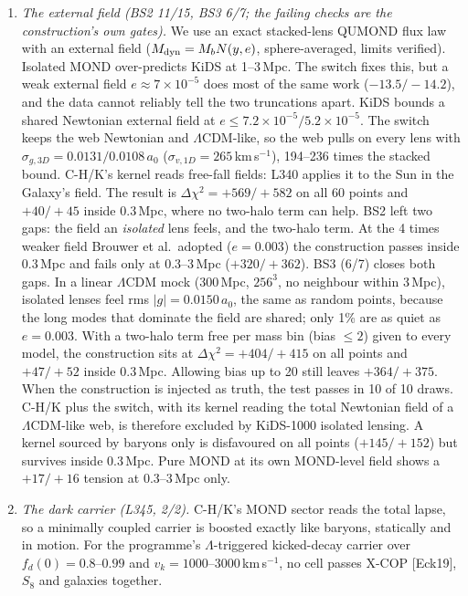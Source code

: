 \documentclass[10pt]{article}
\begin{document}
\begin{enumerate}[label=(\alph*)]
On the observable, the 1D flux power at fixed mean transmission, the worst deviation is 10.8\% at $x_c=5$ (9.6\% canonical) and 7.2\% at $x_c=7$, against a pre-declared 10\%. That is borderline, and the margin is below the method's systematics (FGPA on a 0.2--0.4\,$h^{-1}$Mpc grid, one realisation).
The thresholds KiDS accepts ($x_c\lesssim3$) have not yet been run on the flux observable. The flux deviation grows as $x_c$ falls (7.2\% at 7, 10.8\% at 5), so a KiDS--forest pincer is expected but is \emph{not} claimed here. L352's statement that it is closed rests on matter power.
\item \emph{The external field (BS2 11/15, BS3 6/7; the failing checks are the construction's own gates).} We use an exact stacked-lens QUMOND flux law with an external field ($M_{\rm dyn}=M_bN(y,e)$, sphere-averaged, limits verified). Isolated MOND over-predicts KiDS at 1--3\,Mpc. The switch fixes this, but a weak external field $e\approx7\times10^{-5}$ does most of the same work ($-13.5/-14.2$), and the data cannot reliably tell the two truncations apart.
KiDS bounds a shared Newtonian external field at $e\leq7.2\times10^{-5}/5.2\times10^{-5}$. The switch keeps the web Newtonian and $\Lambda$CDM-like, so the web pulls on every lens with $\sigma_{g,3D}=0.0131/0.0108\,a_0$ ($\sigma_{v,1D}=265$\,km\,s$^{-1}$), 194--236 times the stacked bound. C-H/K's kernel reads free-fall fields: L340 applies it to the Sun in the Galaxy's field.
The result is $\Delta\chi^2=+569/+582$ on all 60 points and $+40/+45$ inside 0.3\,Mpc, where no two-halo term can help.
BS2 left two gaps: the field an \emph{isolated} lens feels, and the two-halo term. At the 4 times weaker field Brouwer et al.\ adopted ($e=0.003$) the construction passes inside 0.3\,Mpc and fails only at 0.3--3\,Mpc ($+320/+362$).
BS3 (6/7) closes both gaps. In a linear $\Lambda$CDM mock (300\,Mpc, $256^3$, no neighbour within 3\,Mpc), isolated lenses feel rms $|g|=0.0150\,a_0$, the same as random points, because the long modes that dominate the field are shared; only 1\% are as quiet as $e=0.003$. With a two-halo term free per mass bin (bias $\leq2$) given to every model, the construction sits at $\Delta\chi^2=+404/+415$ on all points and $+47/+52$ inside 0.3\,Mpc. Allowing bias up to 20 still leaves $+364/+375$. When the construction is injected as truth, the test passes in 10 of 10 draws.
C-H/K plus the switch, with its kernel reading the total Newtonian field of a $\Lambda$CDM-like web, is therefore excluded by KiDS-1000 isolated lensing. A kernel sourced by baryons only is disfavoured on all points ($+145/+152$) but survives inside 0.3\,Mpc. Pure MOND at its own MOND-level field shows a $+17/+16$ tension at 0.3--3\,Mpc only.
\item \emph{The dark carrier (L345, 2/2).} C-H/K's MOND sector reads the total lapse, so a minimally coupled carrier is boosted exactly like baryons, statically and in motion. For the programme's $\Lambda$-triggered kicked-decay carrier over $f_d(0)=0.8$--$0.99$ and $v_k=1000$--$3000$\,km\,s$^{-1}$, no cell passes X-COP [Eck19], $S_8$ and galaxies together.
\end{enumerate}
\end{document}
